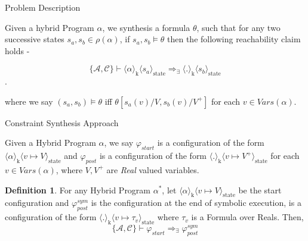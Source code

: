 \documentclass[11pt]{article}
\theoremstyle{definition}
\newtheorem{definition}{Definition}[section]
\begin{document}
\newcommand{\cell}[2]{\langle #1 \rangle_{\text{#2}}}
\newcommand{\post}[1]{#1^{+}}
\newcommand{\vars}[1]{\textit{Vars}(#1)}
\newcommand{\startConfig}{\varphi_{\textit{start}}}
\newcommand{\postConfig}{\varphi_{\textit{post}}}
\newcommand{\axioms}{\mathcal{A}}
\newcommand{\circularities}{\mathcal{C}}
\newcommand{\postSymbolicConfig}{\varphi^{\textit{sym}}_{\textit{post}}}

\begin{section}{Problem Description}

Given a hybrid Program $\alpha$, we synthesis
a formula $\theta$, such that for any two
successive states $s_a, s_b \in \rho(\alpha)$,
if $s_a, s_b \vDash \theta$ then the following
reachability claim holds -

$$ \{\axioms,\circularities\} \vdash \cell{\alpha}{k} \cell{s_a}{state} \Rightarrow_{\exists} \cell{.}{k}
\cell{s_b}{state} $$.

where we say $(s_a, s_b) \vDash \theta$ iff $\theta[s_a(v) / V, s_b(v) / \post{V}]$
for each $v \in \vars{\alpha}$.

\begin{subsection}{Constraint Synthesis Approach}

Given a Hybrid Program $\alpha$, we say $\startConfig$ is a configuration
of the form $\cell{\alpha}{k} \cell{v \mapsto V}{state}$ and $\postConfig$
is a configuration of the form $\cell{.}{k} \cell{v \mapsto \post{V}}{state}$
for each $v \in \vars{\alpha}$, where
$V, \post{V}$ are \textit{Real} valued variables.

\theoremstyle{definition}
    \begin{definition}
    For any Hybrid Program $\alpha^*$, let
    $\cell{\alpha}{k} \cell{v \mapsto V}{state}$ be the
     start configuration and $\postSymbolicConfig$
    is the configuration at the end of symbolic execution, is
    a configuration of the form $\cell{.}{k} \cell{v \mapsto \tau_{v}}{state}$
    where $\tau_v$ is a Formula over Reals.
    Then,
    $$
        \{\mathcal{A}, \mathcal{C}\} \vdash \startConfig
        \Rightarrow_{\exists} \postSymbolicConfig
    $$
    \end{definition}


\end{subsection}
\end{section}
\end{document}

